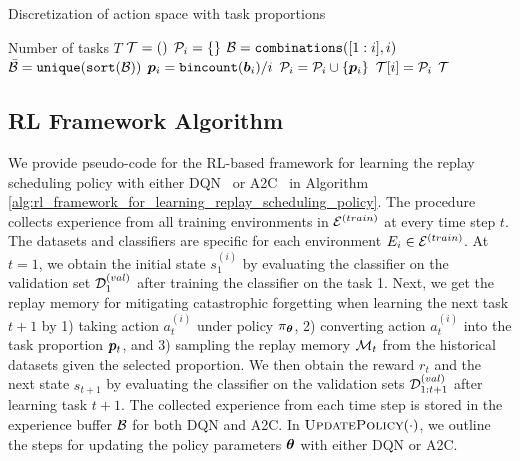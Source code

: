 \begin{algorithm}[t]
	\small
	\caption{Discretization of action space with task proportions}
	\label{alg:action_space_discretization_paperD}
	\begin{algorithmic}[1]
		\Require Number of tasks $T$
		\State ${\mathcal{T}} = ()$ 
		\State ${\mathcal{P}}_i = \{\}$ 
		\State ${\mathcal{B}} = \texttt{combinations}([1:i], i)$ 
		\State $\bar{{\mathcal{B}}} = \texttt{unique}(\texttt{sort}({\mathcal{B}}))$ 
		\State ${\bm{p}}_i = \texttt{bincount}({\bm{b}}_i) / i$ 
		\State ${\mathcal{P}}_i = {\mathcal{P}}_i \cup \{ {\bm{p}}_i \}$ 
		\EndFor
		\State ${\mathcal{T}}[i] = {\mathcal{P}}_i$ 
		\EndFor
		\State \Return ${\mathcal{T}}$ 
	\end{algorithmic}
\end{algorithm}



\subsection*{RL Framework Algorithm}\label{paperD:app:rl_framework_algorithm}

We provide pseudo-code for the RL-based framework for learning the replay scheduling policy with either DQN~ or A2C~ in Algorithm \ref{alg:rl_framework_for_learning_replay_scheduling_policy}. The procedure collects experience from all training environments in ${\mathcal{E}}^{(train)}$ at every time step $t$. The datasets and classifiers are specific for each environment $E_i \in {\mathcal{E}}^{(train)}$. At $t=1$, we obtain the initial state $s_1^{(i)}$ by evaluating the classifier on the validation set ${\mathcal{D}}_1^{(val)}$ after training the classifier on the task 1. Next, we get the replay memory for mitigating catastrophic forgetting when learning the next task $t+1$ by 1) taking action $a_t^{(i)}$ under policy $\pi_{{\bm{\theta}}}$, 2) converting action $a_t^{(i)}$ into the task proportion ${\bm{p}}_{t}$, and 3) sampling the replay memory ${\mathcal{M}}_t$ from the historical datasets given the selected proportion. We then obtain the reward $r_t$ and the next state $s_{t+1}$ by evaluating the classifier on the validation sets ${\mathcal{D}}_{1:t+1}^{(val)}$ after learning task $t+1$. The collected experience from each time step is stored in the experience buffer ${\mathcal{B}}$ for both DQN and A2C. In $\textsc{UpdatePolicy}(\cdot)$, we outline the steps for updating the policy parameters ${\bm{\theta}}$ with either DQN or A2C. 

